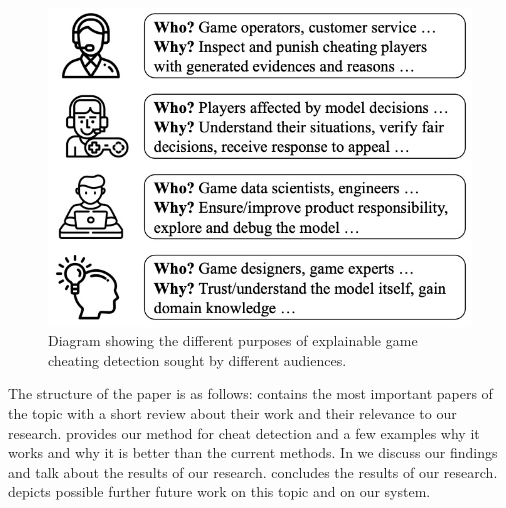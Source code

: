 \begin{figure}[h]
\centering
\includegraphics[width=0.4\linewidth]{contents/images/purpose.jpeg}
\captionsetup{width=0.4\textwidth}
\caption{\label{fig:purpose}Diagram showing the different purposes of explainable game cheating detection sought by different audiences.}
\end{figure}

The structure of the paper is as follows:  contains the most important papers of the topic with a short review about their work and their relevance to our research.
 provides our method for cheat detection and a few examples why it works and why it is better than the current methods.
In  we discuss our findings and talk about the results of our research.
 concludes the results of our research.
 depicts possible further future work on this topic and on our system.